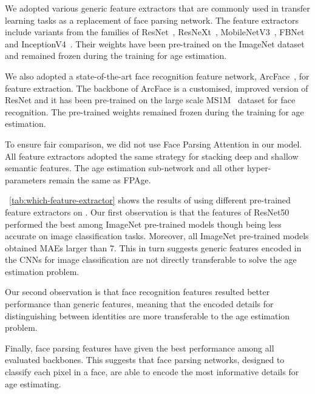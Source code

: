 We adopted various generic feature extractors that are commonly used in transfer learning tasks as a replacement of face parsing network. The feature extractors include variants from the families of ResNet~\cite{resnet}, ResNeXt~\cite{xie2017resnext}, MobileNetV3~\cite{howard2019mobilenetv3}, FBNet~\cite{wu2019fbnet} and InceptionV4~\cite{szegedy2017inceptionv4}. Their weights have been pre-trained on the ImageNet dataset and remained frozen during the training for age estimation.

We also adopted a state-of-the-art face recognition feature network, ArcFace~\cite{deng2018arcface}, for feature extraction. The backbone of ArcFace is a customised, improved version of ResNet and it has been pre-trained on the large scale MS1M~\cite{guo2016ms1m} dataset for face recognition. The pre-trained weights remained frozen during the training for age estimation.

To ensure fair comparison, we did not use Face Parsing Attention in our model. All feature extractors adopted the same strategy for stacking deep and shallow semantic features. The age estimation sub-network and all other hyper-parameters remain the same as FPAge.

\tableautorefname~\ref{tab:which-feature-extractor} shows the results of using different pre-trained feature extractors on \imdbc. Our first observation is that the features of ResNet50 performed the best among ImageNet pre-trained models though being less accurate on image classification tasks. Moreover, all ImageNet pre-trained models obtained MAEs larger than 7. This in turn suggests generic features encoded in the CNNs for image classification are not directly transferable to solve the age estimation problem. 

Our second observation is that
face recognition features resulted better performance than generic features, meaning that the encoded details for distinguishing between identities are more transferable to the age estimation problem.

Finally, face parsing features have given the best performance among all evaluated backbones. This suggests that face parsing networks, designed to classify each pixel in a face, are able to encode the most informative details for age estimating.



